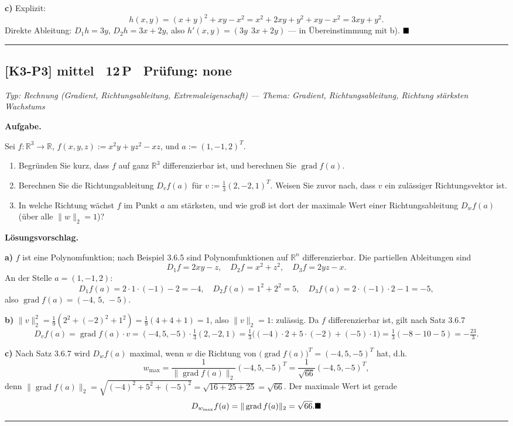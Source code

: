 \documentclass[a4paper,11pt]{article}
\providecommand{\qed}{\hfill\ensuremath{\blacksquare}}
\begin{document}
\textbf{c)} Explizit:
\[
h(x,y)=(x+y)^2+xy-x^2=x^2+2xy+y^2+xy-x^2=3xy+y^2 .
\]
Direkte Ableitung: $D_1 h=3y$, $D_2 h=3x+2y$, also $h'(x,y)=(3y\ \ 3x+2y)$ — in \"Ubereinstimmung mit b). $\qed$\par\bigskip\hrule\bigskip
\subsection*{[K3-P3] \normalfont mittel \textbullet\ 12\,P \textbullet\ Pr\"ufung: none}
\textit{Typ: Rechnung (Gradient, Richtungsableitung, Extremaleigenschaft)  ---  Thema: Gradient, Richtungsableitung, Richtung stärksten Wachstums}\par\smallskip
\textbf{Aufgabe.}\par
Sei $f:\mathbb{R}^3\to\mathbb{R}$, $f(x,y,z):=x^2y+yz^2-xz$, und $a:=(1,-1,2)^{T}$.
\begin{enumerate}[label=\alph*)]
\item Begr\"unden Sie kurz, dass $f$ auf ganz $\mathbb{R}^3$ differenzierbar ist, und berechnen Sie $\operatorname{grad} f(a)$.
\item Berechnen Sie die Richtungsableitung $D_v f(a)$ f\"ur $v:=\tfrac13(2,-2,1)^{T}$. Weisen Sie zuvor nach, dass $v$ ein zul\"assiger Richtungsvektor ist.
\item In welche Richtung w\"achst $f$ im Punkt $a$ am st\"arksten, und wie gro\ss{} ist dort der maximale Wert einer Richtungsableitung $D_w f(a)$ (\"uber alle $\|w\|_2=1$)?
\end{enumerate}\par\smallskip
\textbf{L\"osungsvorschlag.}\par
\textbf{a)} $f$ ist eine Polynomfunktion; nach Beispiel 3.6.5 sind Polynomfunktionen auf $\mathbb{R}^n$ differenzierbar. Die partiellen Ableitungen sind
\[
D_1f=2xy-z,\quad D_2f=x^2+z^2,\quad D_3f=2yz-x .
\]
An der Stelle $a=(1,-1,2)$:
\[
D_1f(a)=2\cdot1\cdot(-1)-2=-4,\quad D_2f(a)=1^2+2^2=5,\quad D_3f(a)=2\cdot(-1)\cdot2-1=-5,
\]
also $\operatorname{grad} f(a)=(-4,\,5,\,-5)$.

\textbf{b)} $\|v\|_2^2=\tfrac19(2^2+(-2)^2+1^2)=\tfrac19(4+4+1)=1$, also $\|v\|_2=1$: zul\"assig. Da $f$ differenzierbar ist, gilt nach Satz 3.6.7
\[
D_v f(a)=\operatorname{grad} f(a)\cdot v=(-4,5,-5)\cdot\tfrac13(2,-2,1)=\tfrac13\bigl((-4)\cdot2+5\cdot(-2)+(-5)\cdot1\bigr)=\tfrac13(-8-10-5)=-\tfrac{23}{3}.
\]

\textbf{c)} Nach Satz 3.6.7 wird $D_w f(a)$ maximal, wenn $w$ die Richtung von $\bigl(\operatorname{grad} f(a)\bigr)^{T}=(-4,5,-5)^{T}$ hat, d.h.
\[
w_{\max}=\frac{1}{\|\operatorname{grad} f(a)\|_2}(-4,5,-5)^{T}=\frac{1}{\sqrt{66}}(-4,5,-5)^{T},
\]
denn $\|\operatorname{grad} f(a)\|_2=\sqrt{(-4)^2+5^2+(-5)^2}=\sqrt{16+25+25}=\sqrt{66}$. Der maximale Wert ist gerade
\[
D_{w_{\max}}f(a)=\|\operatorname{grad} f(a)\|_2=\sqrt{66}. \qed
\]\par\bigskip\hrule\bigskip
\end{document}
